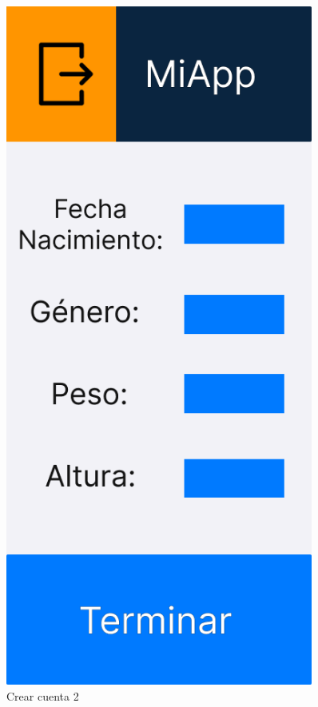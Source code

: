 \begin{figure}[H]
\begin{minipage}{0.45\textwidth}
      \label{fig:Crear cuenta 1}
   \end{minipage}%
   \hspace{0.5cm}
   \begin{minipage}{0.45\textwidth}
      \centering
      \includegraphics[width=0.9\textwidth]{fotos/Frame 25.png}
      \caption{Crear cuenta 2}
      \label{fig:Crear cuenta 2}
   \end{minipage}
\end{figure}

